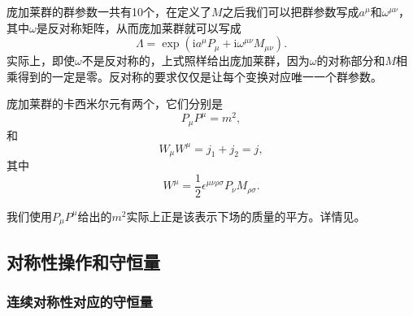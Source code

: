\documentclass[hyperref, UTF8, a4paper]{ctexart}
\newcommand*{\ii}{\mathrm{i}}
\renewcommand{\autoref}{\prettyref}
\begin{document}
庞加莱群的群参数一共有10个，在定义了$M$之后我们可以把群参数写成$a^\mu$和$\omega^{\mu \nu}$，其中$\omega$是反对称矩阵，从而庞加莱群就可以写成
\[
    \Lambda = \exp \left( \ii a^\mu P_\mu + \ii \omega^{\mu \nu} M_{\mu \nu} \right).
\]
实际上，即使$\omega$不是反对称的，上式照样给出庞加莱群，因为$\omega$的对称部分和$M$相乘得到的一定是零。反对称的要求仅仅是让每个变换对应唯一一个群参数。

庞加莱群的卡西米尔元有两个，它们分别是
\begin{equation}
    P_\mu P^\mu = m^2,
    \label{eq:momentum-and-mass}
\end{equation}
和
\begin{equation}
    W_\mu W^\mu = j_1 + j_2 = j,
\end{equation}
其中
\begin{equation}
    W^\mu = \frac{1}{2} \epsilon^{\mu \nu \rho \sigma} P_\nu M_{\rho \sigma}.
\end{equation}

我们使用$P_\mu P^\mu$给出的$m^2$实际上正是该表示下场的质量的平方。详情见\autoref{sec:k-g-eq}。

\subsection{对称性操作和守恒量}

\subsubsection{连续对称性对应的守恒量}
\end{document}
